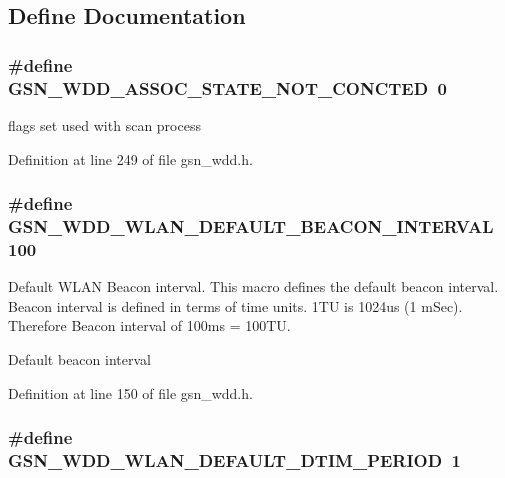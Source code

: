 \subsection{Define Documentation}
\hypertarget{a00677_ga5f07a309e776550d66ddc892d44295ae}{
\subsubsection[{GSN\_\-WDD\_\-ASSOC\_\-STATE\_\-NOT\_\-CONCTED}]{\setlength{\rightskip}{0pt plus 5cm}\#define GSN\_\-WDD\_\-ASSOC\_\-STATE\_\-NOT\_\-CONCTED~0}}
\label{a00677_ga5f07a309e776550d66ddc892d44295ae}


flags set used with scan process 



Definition at line 249 of file gsn\_\-wdd.h.

\hypertarget{a00677_gab70cb03c6369e528aaa34311acfc1726}{
\subsubsection[{GSN\_\-WDD\_\-WLAN\_\-DEFAULT\_\-BEACON\_\-INTERVAL}]{\setlength{\rightskip}{0pt plus 5cm}\#define GSN\_\-WDD\_\-WLAN\_\-DEFAULT\_\-BEACON\_\-INTERVAL~100}}
\label{a00677_gab70cb03c6369e528aaa34311acfc1726}


Default WLAN Beacon interval. This macro defines the default beacon interval. Beacon interval is defined in terms of time units. 1TU is 1024us (1 mSec). Therefore Beacon interval of 100ms = 100TU. 

Default beacon interval 

Definition at line 150 of file gsn\_\-wdd.h.

\hypertarget{a00677_ga406fd2f9962a7ec83167cd6bcafdd221}{
\subsubsection[{GSN\_\-WDD\_\-WLAN\_\-DEFAULT\_\-DTIM\_\-PERIOD}]{\setlength{\rightskip}{0pt plus 5cm}\#define GSN\_\-WDD\_\-WLAN\_\-DEFAULT\_\-DTIM\_\-PERIOD~1}}
\label{a00677_ga406fd2f9962a7ec83167cd6bcafdd221}


